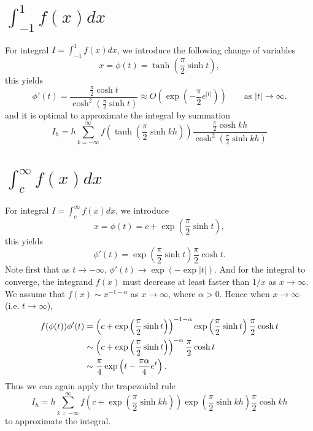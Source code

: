 \section{$\int_{-1}^1 f(x) dx$}

For integral $I=\int_{-1}^1 f(x) dx$, we introduce the following change of
variables
\begin{equation}
  x = \phi(t) = \tanh \left( \frac{\pi}{2} \sinh t \right),
\end{equation}
this yields 
\begin{equation}
  \phi'(t) = \frac{ \frac{\pi}{2} \cosh t }{ \cosh^2 (\frac{\pi}{2} \sinh t) }
           \approx O \left( \exp( -\frac{\pi}{2} e^{|t|} ) \right)
           \qquad \text{as $|t|\to \infty$}.
\end{equation}
and it is optimal to approximate the integral by summation
\begin{equation}
  I_h = h \sum_{k=-\infty}^{\infty} 
    f\left( \tanh \left( \frac{\pi}{2} \sinh kh \right)  \right)
    \frac{ \frac{\pi}{2} \cosh kh }{ \cosh^2 (\frac{\pi}{2} \sinh kh) }
\end{equation}

\section{$\int_{c}^{\infty} f(x) dx$}

For integral $I=\int_c^{\infty} f(x) dx$, we introduce 
\begin{equation}
  x = \phi(t) = c + \exp \left( \frac{\pi}{2} \sinh t \right),
\end{equation}
this yields
\begin{equation}
  \phi'(t) = 
    \exp \left( \frac{\pi}{2} \sinh t \right)  
    \frac{\pi}{2} \cosh t.
\end{equation}
Note first that as $t\to -\infty$, $\phi'(t)\to \exp(-\exp|t|)$.
And for the integral to converge, the integrand $f(x)$ must decrease at least
faster than $1/x$ as $x\to \infty$. We assume that $f(x)\sim x^{-1-\alpha}$ as
$x\to \infty$, where $\alpha>0$. Hence when $x\to \infty$ (i.e. $t\to \infty$),
\begin{align*}
  f(\phi(t)) \phi'(t)
    &= \left( c+ \exp \left( \frac{\pi}{2} \sinh t \right)  \right)^{-1-\alpha}
       \exp \left( \frac{\pi}{2} \sinh t \right)  \frac{\pi}{2} \cosh t 
       \notag \\
    &\sim \left( c+ \exp \left( \frac{\pi}{2} \sinh t \right)  \right)^{-\alpha}
          \frac{\pi}{2} \cosh t \notag \\
    &\sim \frac{\pi}{4} \exp \left( t-\frac{\pi \alpha}{4} e^t \right).
       \notag \\
\end{align*}
Thus we can again apply the trapezoidal rule 
\begin{equation}
  I_h = h \sum_{k=-\infty}^{\infty} 
    f\left( c+ \exp \left( \frac{\pi}{2} \sinh kh \right)  \right)
    \exp \left( \frac{\pi}{2} \sinh kh \right)  
    \frac{\pi}{2} \cosh kh 
\end{equation}
to approximate the integral.



